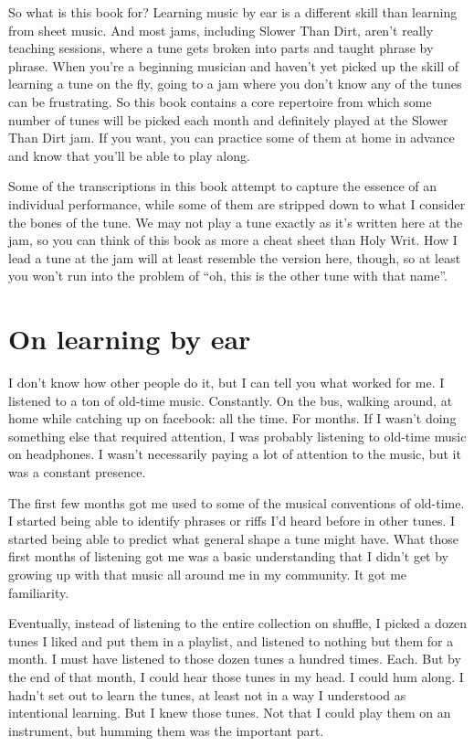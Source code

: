 So what is this book for? Learning music by ear is a different skill
than learning from sheet music. And most jams, including Slower Than
Dirt, aren't really teaching sessions, where a tune gets broken into
parts and taught phrase by phrase. When you're a beginning musician
and haven't yet picked up the skill of learning a tune on the fly,
going to a jam where you don't know any of the tunes can be
frustrating. So this book contains a core repertoire from which some
number of tunes will be picked each month and definitely played at the
Slower Than Dirt jam. If you want, you can practice some of them at
home in advance and know that you'll be able to play along.

Some of the transcriptions in this book attempt to capture the essence
of an individual performance, while some of them are stripped down to
what I consider the bones of the tune. We may not play a tune exactly
as it's written here at the jam, so you can think of this book as more
a cheat sheet than Holy Writ. How I lead a tune at the jam will at
least resemble the version here, though, so at least you won't run
into the problem of ``oh, this is the other tune with that name''.


\section*{On learning by ear}

I don't know how other people do it, but I can tell you what worked
for me. I listened to a ton of old-time music. Constantly. On the bus,
walking around, at home while catching up on facebook: all the
time. For months. If I wasn't doing something else that required
attention, I was probably listening to old-time music on headphones. I
wasn't necessarily paying a lot of attention to the music, but it was
a constant presence.

The first few months got me used to some of the musical conventions of
old-time. I started being able to identify phrases or riffs I'd heard
before in other tunes. I started being able to predict what general
shape a tune might have. What those first months of listening got me
was a basic understanding that I didn't get by growing up with that
music all around me in my community. It got me familiarity.

Eventually, instead of listening to the entire collection on shuffle,
I picked a dozen tunes I liked and put them in a playlist, and
listened to nothing but them for a month. I must have listened to
those dozen tunes a hundred times. Each. But by the end of that month,
I could hear those tunes in my head. I could hum along. I hadn't set
out to learn the tunes, at least not in a way I understood as
intentional learning. But I knew those tunes. Not that I could play
them on an instrument, but humming them was the important part.

